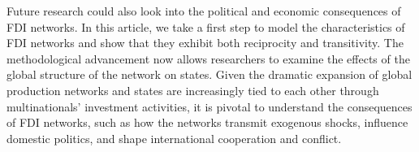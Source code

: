 \documentclass[reqno,onecolumn,letterpaper,12pt]{article}
\begin{document}
Future research could also look into the political and economic consequences of FDI networks. In this article, we take a first step to model the characteristics of FDI networks and show that they exhibit both reciprocity and transitivity. The methodological advancement now allows researchers to examine the effects of the global structure of the network on states. Given the dramatic expansion of global production networks and states are increasingly tied to each other through multinationals' investment activities, it is pivotal to understand the consequences of FDI networks, such as how the networks transmit exogenous shocks, influence domestic politics, and shape international cooperation and conflict.




\newpage
\singlespacing


\end{document}
